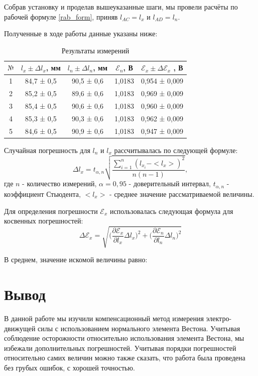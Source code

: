 \documentclass[a4paper,12pt]{article}
\begin{document}
Собрав установку и проделав вышеуказанные шаги, мы провели расчёты по рабочей формуле \eqref{rab_form}, приняв $l_{AC}=l_x$ и  $l_{AD}=l_n$.

Полученные в ходе работы данные указаны ниже:
\begin{table}[!h]
\begin{center}
	\begin{tabular}{|c|c|c|c|c|}
		\hline
		$№$&$l_x \pm\Delta l_x$, мм&$l_n \pm\Delta l_n$, мм&$\mathcal{E}_n$, В&$\mathcal{E}_x \pm\Delta \mathcal{E}_x$ , В
		\\ 
		\hline
		1	&84,7	 ± 0,5 & 	 90,5 ± 0,6 		&1,0183	& 0,954 ± 0,009
		\\
		\hline
		2	&85,2	 ± 0,5 &	 89,6 ± 0,6		&1,0183	& 0,969 ± 0,009
		\\
		\hline
		3	&85,4	 ± 0,5 &	 90,6 ± 0,6		&1,0183	& 0,960 ± 0,009
		\\
		\hline
		4	&85,3	 ± 0,5 & 	90,3 ± 0,6		&1,0183	& 0,962 ± 0,009
		\\
		\hline
		5	&84,6	 ± 0,5 & 	90,9 ± 0,6		&1,0183 	& 0,947 ± 0,009
		\\
		\hline	
	\end{tabular}
	\caption{Результаты измерений}
	\end{center}
\end{table}

Случайная погрешность для $l_n$ и $l_x$ рассчитывалась по следующей формуле:
$$\Delta l_x = t_{\alpha,n}\sqrt{\frac{\sum_{i=1}^n(l_{x_i} - <l_x>)^2}{n(n-1)}},$$
где $n$ - количество измерений, $\alpha = 0,95$ - доверительный интервал, $t_{\alpha,n}$ - коэффициент Стьюдента, $<l_x>$ - среднее значение рассматриваемой величины.

Для определения погрешности $\mathcal{E}_x$ использовалась следующая формула для косвенных погрешностей:
$$\Delta \mathcal{E}_x = \sqrt{\bigg(\frac{\partial\mathcal{E}_x}{\partial l_x}\Delta l_x\bigg)^2 + \bigg(\frac{\partial\mathcal{E}_n}{\partial l_n}\Delta l_n\bigg)^2}$$


В среднем, значение искомой величины равно:
\begin{center}
\end{center}

\section{Вывод}
В данной работе мы изучили компенсационный метод измерения электро-движущей силы с использованием нормального элемента Вестона. Учитывая соблюдение осторожности относительно использования элемента Вестона, мы избежали дополнительных погрешностей. Учитывая порядки погрешностей относительно самих величин можно также сказать, что работа была проведена без грубых ошибок, с хорошей точностью.
\end{document}
